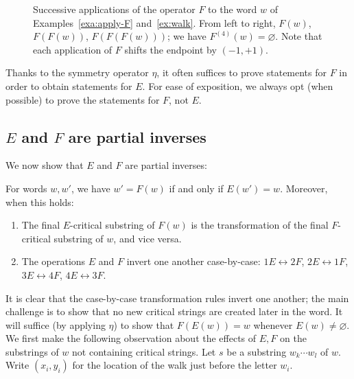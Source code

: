 \documentclass[ALCO,ThmDefs,Unicode,epreuves]{cedram}
\begin{document}
\begin{exam}
\begin{figure}[htb]
\caption{\label{fig:F-on-walks} Successive applications of the operator $F$ to the word 
$w$ of Examples~\ref{exa:apply-F} and~\ref{ex:walk}. From left to right, $F(w)$, $F(F(w))$, $F(F(F(w)))$; we have $F^{(4)}(w) = \varnothing$. Note that each application of $F$ shifts the endpoint by $(-1,+1)$.}
\end{figure}
\end{exam}




Thanks to the symmetry operator $\eta$, it often suffices to prove statements for $F$ in order to obtain statements for $E$. For ease of exposition, we always opt (when possible) to prove the statements for $F$, not $E$.

\subsection{\texorpdfstring{$E$}{E} and \texorpdfstring{$F$}{F} are partial inverses}

We now show that $E$ and $F$ are partial inverses:
\begin{prop}\label{prop:inverses}
For words $w,w'$, we have $w' = F(w)$ if and only if $E(w') = w$. Moreover, when this holds:
\begin{enumerate}[label={(\roman*)}]
\item %
The final $E$-critical substring of $F(w)$ is the transformation of the final $F$-critical substring of $w$, and vice versa.
\item %
The operations $E$ and $F$ invert one another case-by-case: $1E \leftrightarrow 2F$, $2E \leftrightarrow 1F$, $3E \leftrightarrow 4F$, $4E \leftrightarrow 3F$.
\end{enumerate}
\end{prop}

It is clear that the case-by-case transformation rules invert one another; the main challenge is to show that no new critical strings are created later in the word. It will suffice (by applying $\eta$) to show that $F(E(w)) = w$ whenever $E(w) \ne \varnothing$. We first make the following observation about the effects of $E,F$ on the substrings of $w$ not containing critical strings. Let $s$ be a substring $w_k \cdots w_l$ of $w$. Write $(x_i,y_i)$ for the location of the walk just before the letter $w_i$.
\end{document}
